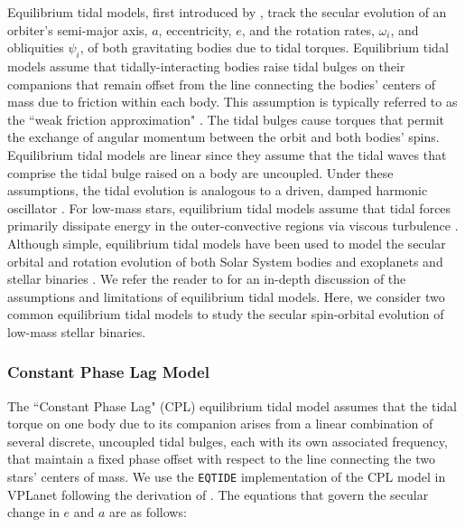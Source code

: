 \documentclass[twocolumn]{aastex61}
\newcommand{\eqtide}[0]{\texttt{EQTIDE}\xspace}
\begin{document}
 Equilibrium tidal models, first introduced by \citet{Darwin1880}, track the secular evolution of an orbiter's semi-major axis, $a$, eccentricity, $e$, and the rotation rates, $\omega_i$, and obliquities $\psi_i$, of both gravitating bodies due to tidal torques. Equilibrium tidal models assume that tidally-interacting bodies raise tidal bulges on their companions that remain offset from the line connecting the bodies' centers of mass due to friction within each body. This assumption is typically referred to as the ``weak friction approximation" \citep{Zahn2008}.  The tidal bulges cause torques that permit the exchange of angular momentum between the orbit and both bodies' spins. Equilibrium tidal models are linear since they assume that the tidal waves that comprise the tidal bulge raised on a body are uncoupled. Under these assumptions, the tidal evolution is analogous to a driven, damped harmonic oscillator \citep{Greenberg2009}. For low-mass stars, equilibrium tidal models assume that tidal forces primarily dissipate energy in the outer-convective regions via viscous turbulence \citep[see][]{Zahn2008}. Although simple, equilibrium tidal models have been used to model the secular orbital and rotation evolution of both Solar System bodies and exoplanets \citep[e.g.][]{Goldreich1966,Jackson2009,Leconte2010,Heller2011,Barnes2013,Barnes2017} and stellar binaries \citep[e.g.][]{Zahn1989,Zahn2008,Khaliullin2011,Repetto2014,Fleming2018}. We refer the reader to \citet{Barnes2017} for an in-depth discussion of the assumptions and limitations of equilibrium tidal models. Here, we consider two common equilibrium tidal models to study the secular spin-orbital evolution of low-mass stellar binaries.  

\subsubsection{Constant Phase Lag Model}

The ``Constant Phase Lag" (CPL) \citep[][]{FerrazMello2008,Heller2011} equilibrium tidal model assumes that the tidal torque on one body due to its companion arises from a linear combination of several discrete, uncoupled tidal bulges, each with its own associated frequency, that maintain a fixed phase offset with respect to the line connecting the two stars' centers of mass. We use the \eqtide implementation of the CPL model in VPLanet following the derivation of \citet{FerrazMello2008}.  The equations that govern the secular change in $e$ and $a$ are as follows:
\end{document}
